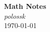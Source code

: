 \documentclass[12pt,b5paper]{book}
\title{\strtitle}
\author{\strauthor}
\date{\today}
\newcommand\strtitle{Math Notes}
\newcommand\strauthor{polossk}
\begin{document}
\thispagestyle{fancy}
\begin{titlepage}
    \vspace*{4em}
    \begin{center}
        {\Huge \bf \strtitle} \\
        \vspace{1em}
        {\Large \it \strauthor} \\
        \vspace{1em}
        {\large \today} \\
    \end{center}
\end{titlepage}
\clearpage
\tableofcontents
\clearpage







\end{document}
